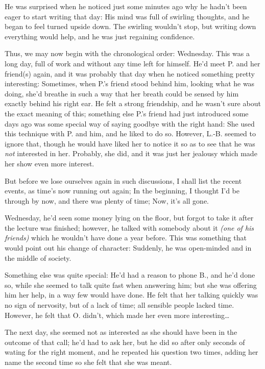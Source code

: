 He was surprised when he noticed just some minutes ago why he hadn't been eager to start writing that day: His mind was full of swirling thoughts, and he began to feel turned upside down. The swirling wouldn't stop, but writing down everything would help, and he was just regaining confidence.

Thus, we may now begin with the chronological order: Wednesday. This was a long day, full of work and without any time left for himself. He'd meet P. and her friend(s) again, and it was probably that day when he noticed something pretty interesting: Sometimes, when P.'s friend stood behind him, looking what he was doing, she'd breathe in such a way that her breath could be sensed by him exactly behind his right ear. He felt a strong friendship, and he wasn't sure about the exact meaning of this; something else P.'s friend had just introduced some days ago was some special way of saying goodbye with the right hand: She used this technique with P. and him, and he liked to do so. However, L.-B. seemed to ignore that, though he would have liked her to notice it so as to see that he was \emph{not} interested in her. Probably, she did, and it was just her jealousy which made her show even more interest.

But before we lose ourselves again in such discussions, I shall list the recent events, as time's now running out again; In the beginning, I thought I'd be through by now, and there was plenty of time; Now, it's all gone.

Wednesday, he'd seen some money lying on the floor, but forgot to take it after the lecture was finished; however, he talked with somebody about it \emph{(one of his friends)} which he wouldn't have done a year before. This was something that would point out his change of character: Suddenly, he was open-minded and in the middle of society.

Something else was quite special: He'd had a reason to phone B., and he'd done so, while she seemed to talk quite fast when answering him; but she was offering him her help, in a way few would have done. He felt that her talking quickly was no sign of nervosity, but of a lack of time; all sensible people lacked time. However, he felt that O. didn't, which made her even more interesting\ldots

The next day, she seemed not as interested as she should have been in the outcome of that call; he'd had to ask her, but he did so after only seconds of wating for the right moment, and he repeated his question two times, adding her name the second time so she felt that she was meant.

